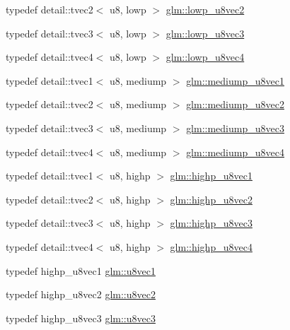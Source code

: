 \begin{DoxyCompactItemize}
\item 
typedef detail\+::tvec2$<$ u8, lowp $>$ \hyperlink{group__gtc__type__precision_ga8e5a056cbbcb70dca5c65950fa13a787}{glm\+::lowp\+\_\+u8vec2}
\item 
typedef detail\+::tvec3$<$ u8, lowp $>$ \hyperlink{group__gtc__type__precision_gaf0d7154052c636edf4a902fc8a4a56f2}{glm\+::lowp\+\_\+u8vec3}
\item 
typedef detail\+::tvec4$<$ u8, lowp $>$ \hyperlink{group__gtc__type__precision_ga98f82380862128fac9afae1b53840562}{glm\+::lowp\+\_\+u8vec4}
\item 
typedef detail\+::tvec1$<$ u8, mediump $>$ \hyperlink{group__gtc__type__precision_gadefca284b7a5980fb6be735abb77395e}{glm\+::mediump\+\_\+u8vec1}
\item 
typedef detail\+::tvec2$<$ u8, mediump $>$ \hyperlink{group__gtc__type__precision_ga5e20c1315bc1fecc867bc74525bea2ab}{glm\+::mediump\+\_\+u8vec2}
\item 
typedef detail\+::tvec3$<$ u8, mediump $>$ \hyperlink{group__gtc__type__precision_ga58f79eee840b2838443292c50ddb2919}{glm\+::mediump\+\_\+u8vec3}
\item 
typedef detail\+::tvec4$<$ u8, mediump $>$ \hyperlink{group__gtc__type__precision_ga407b5aa9a3fd6d344b70fa6ce2ce92d4}{glm\+::mediump\+\_\+u8vec4}
\item 
typedef detail\+::tvec1$<$ u8, highp $>$ \hyperlink{group__gtc__type__precision_ga8e7e9156357a2b748fe39702c3bdbeec}{glm\+::highp\+\_\+u8vec1}
\item 
typedef detail\+::tvec2$<$ u8, highp $>$ \hyperlink{group__gtc__type__precision_ga9aed4b3bacd37a43ec369bcf76be144a}{glm\+::highp\+\_\+u8vec2}
\item 
typedef detail\+::tvec3$<$ u8, highp $>$ \hyperlink{group__gtc__type__precision_ga52bdf53a4f05023c13a9b817526d249f}{glm\+::highp\+\_\+u8vec3}
\item 
typedef detail\+::tvec4$<$ u8, highp $>$ \hyperlink{group__gtc__type__precision_ga3a46f19674a65471988b41ffdaa834c5}{glm\+::highp\+\_\+u8vec4}
\item 
typedef highp\+\_\+u8vec1 \hyperlink{group__gtc__type__precision_gaf0155c700da11c0b5518a777d1f0cd23}{glm\+::u8vec1}
\item 
typedef highp\+\_\+u8vec2 \hyperlink{group__gtc__type__precision_gaa7ea171741c23b5bb2a3c91fe8c84e8a}{glm\+::u8vec2}
\item 
typedef highp\+\_\+u8vec3 \hyperlink{group__gtc__type__precision_ga3b4624ecd0485fe5143f956864e7934e}{glm\+::u8vec3}
\item 

\end{DoxyCompactItemize}
